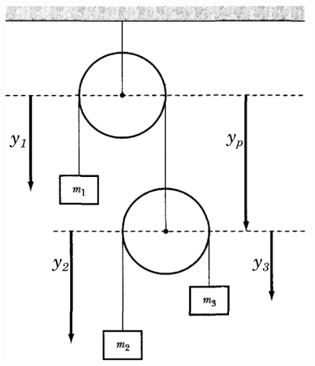 \documentclass[11pt, spanish, a4paper, twoside]{article}
\begin{document}
\begin{enumerate}
\begin{minipage}[c][0cm][t]{0.3\textwidth}
	\includegraphics[width=\textwidth]{figures/marion_fig7_6}
\end{minipage}



\end{enumerate}
\end{document}
